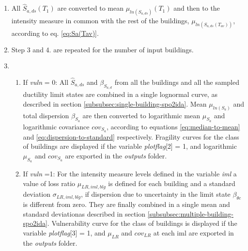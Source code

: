 \begin{enumerate}
\item All $\hat{S}_{a, ds}(T_1)$ are converted to mean $\mu_{ln(S_{a, ds})}(T_1)$ and then to the intensity measure in common with the rest of the buildings, $\mu_{ln(S_{a, ds}(T_{av}))}$, according to eq. \ref{eq:Sa(Tav)}.

\item Step 3 and 4. are repeated for the number of input buildings.

\item
\begin{enumerate}
\item If \textit{vuln} = 0: All $\hat{S}_{a,ds}$ and $\beta_{S_{a, d}}$ from all the buildings and all the sampled ductility limit states are combined in a single lognormal curve, as described in section \ref{subsubsec:single-building-spo2ida}. 
Mean $\mu_{ln(S_{a})}$ and total dispersion $\beta_{S_a}$ are then converted to logarithmic mean $\mu_{S_a}$ and logarithmic covariance $cov_{S_a}$, according to equations \ref{eq:median-to-mean} and \ref{eq:dispersion-to-standard} respectively.
Fragility curves for the class of buildings are displayed if the variable \textit{plotflag}[2] = 1, and logarithmic $\mu_{S_a}$ and $cov_{S_a}$ are exported in the \textit{outputs} folder.
\item If \textit{vuln} =1:  
For the intensity measure levels defined in the variable \textit{iml} a value of loss ratio $\mu_{LR, iml, blg}$ is defined for each building and a standard deviation $\sigma_{LR, iml, blg}$, if dispersion due to uncertainty in the limit state $\beta_{\theta c}$ is different from zero. They are finally combined in a single mean and standard deviationas described in section \ref{subsubsec:multiple-building-spo2ida}. Vulnerability curve for the class of buildings is displayed if the variable \textit{plotflag}[3] = 1, and $\mu_{LR}$ and $cov_{LR}$ at each iml are exported in the \textit{outputs} folder.
\end{enumerate}
\end{enumerate}
